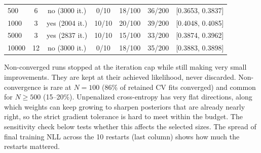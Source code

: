 \documentclass[11pt]{article}
\begin{document}
\begin{itemize}
\begin{center}
{\begin{tabular}{lcccccc}
500 & 6 & no (3000 it.) & 0/10 & 18/100 & 36/200 & [0.3653, 0.3837]\\
1000 & 3 & yes (2004 it.) & 10/10 & 20/100 & 39/200 & [0.4048, 0.4085]\\
5000 & 3 & yes (2837 it.) & 10/10 & 15/100 & 33/200 & [0.3874, 0.3962]\\
10000 & 12 & no (3000 it.) & 0/10 & 18/100 & 35/200 & [0.3883, 0.3898]\\\bottomrule\end{tabular}}\end{center}
Non-converged runs stopped at the iteration cap while still making very small improvements. They are kept at their achieved likelihood, never discarded. Non-convergence is rare at $N=100$ (86\% of retained CV fits converged) and common for $N\ge500$ (15--20\%). Unpenalized cross-entropy has very flat directions, along which weights can keep growing to sharpen posteriors that are already nearly right, so the strict gradient tolerance is hard to meet within the budget. The sensitivity check below tests whether this affects the selected sizes. The spread of final training NLL across the 10 restarts (last column) shows how much the restarts mattered.


\end{itemize}
\end{document}
